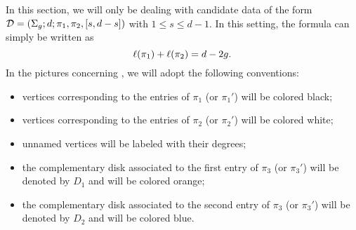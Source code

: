 In this section, we will only be dealing with candidate data of the form $\mathcal{D}=(\Sigma_{g};d;\pi_1,\pi_2,[s,d-s])$ with $1\le s\le d-1$. In this setting, the \RH{} formula can simply be written as
\[
\ell(\pi_1)+\ell(\pi_2)=d-2g.
\]
In the pictures concerning \dessins{}, we will adopt the following conventions:
\begin{itemize}
\item vertices corresponding to the entries of $\pi_1$ (or $\pi_1'$) will be colored black;
\item vertices corresponding to the entries of $\pi_2$ (or $\pi_2'$) will be colored white;
\item unnamed vertices will be labeled with their degrees;
\item the complementary disk associated to the first entry of $\pi_3$ (or $\pi_3'$) will be denoted by $D_1$ and will be colored orange;
\item the complementary disk associated to the second entry of $\pi_3$ (or $\pi_3'$) will be denoted by $D_2$ and will be colored blue.
\end{itemize}

